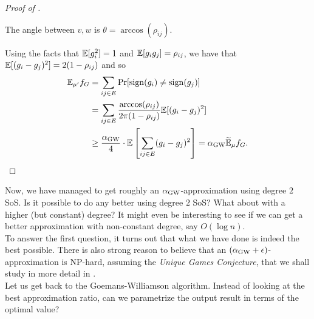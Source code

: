 \begin{proof}[Proof of ]
\begin{center}
		The angle between $v,w$ is $\theta = \arccos(\rho_{ij})$.%
		\end{center}

		Using the facts that $\mathbb{E}[g_i^2] = 1$ and $\mathbb{E}[g_ig_j] = \rho_{ij}$, we have that $\mathbb{E}[(g_i - g_j)^2] = 2(1-\rho_{ij})$ and so
		\begin{align*}
			\mathbb{E}_{\mu'} f_G &= \sum_{ij \in E} \Pr[\operatorname{sign}(g_i) \ne \operatorname{sign}(g_j)] \\
				&= \sum_{ij \in E} \frac{\arccos(\rho_{ij})}{2\pi(1-\rho_{ij})} \mathbb{E}[(g_i - g_j)^2] \\
				&\ge \frac{\alpha_{\text{GW}}}{4} \cdot \mathbb{E}\left[\sum_{ij \in E} (g_i - g_j)^2\right] = \alpha_{\text{GW}} \widetilde{\mathbb{E}}_{\mu} f_G. \qedhere
		\end{align*}
	\end{proof}

	Now, we have managed to get roughly an $\alpha_{\text{GW}}$-approximation using degree $2$ SoS. Is it possible to do any better using degree $2$ SoS? What about with a higher (but constant) degree? It might even be interesting to see if we can get a better approximation with non-constant degree, say $O(\log n)$.\\
	To answer the first question, it turns out that what we have done is indeed the best possible. There is also strong reason to believe that an $(\alpha_{\text{GW}}+\epsilon)$-approximation is \textsf{NP}-hard, assuming the \emph{Unique Games Conjecture}, that we shall study in more detail in .\\

	Let us get back to the Goemans-Williamson algorithm. Instead of looking at the best approximation ratio, can we parametrize the output result in terms of the optimal value?

